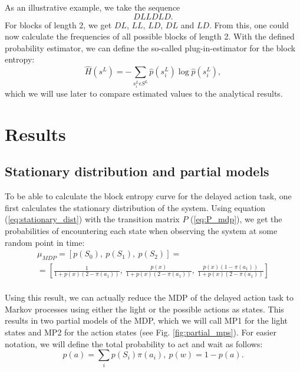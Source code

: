 \documentclass[12pt,a4paper]{article}
\begin{document}
As an illustrative example, we take the sequence
\begin{equation*}
    D L L D L D.
\end{equation*}
For blocks of length 2, we get $DL$, $LL$, $LD$, $DL$ and $LD$.
From this, one could now calculate the frequencies of all possible blocks of length 2.
With the defined probability estimator, we can define the so-called plug-in-estimator for the block entropy:
\begin{equation}
    \label{eq:plug_in_block_ent}
    \hat{H}(s^L) = -\sum_{s_i^L \epsilon S^L} \hat{p}(s_i^L) \log \hat{p}(s_i^L),
\end{equation}
which we will use later to compare estimated values to the analytical results.

\newpage
\section{Results} \label{sec:results}

\subsection{Stationary distribution and partial models} \label{ssec:res_stationary_dist}
To be able to calculate the block entropy curve for the delayed action task, one first calculates the stationary distribution of the system.
Using equation (\ref{eq:stationary_dist}) with the transition matrix $P$ (\ref{eq:P_mdp}), we get the probabilities of encountering each state when observing the system at some random point in time:
\begin{equation}
    \label{eq:result_stationary_dist_mdp}
    \begin{matrix}
        \mu_{MDP} = [p(S_0),\ p(S_1),\ p(S_2)] =       \\
        =[\frac{1}{1 + p(x)(2-\pi(a_1))},\
        \frac{p(x)}{1 + p(x)(2-\pi(a_1))},\
        \frac{p(x)(1-\pi(a_1))}{1 + p(x)(2-\pi(a_1))}] \\
    \end{matrix}
\end{equation}

Using this result, we can actually reduce the MDP of the delayed action task to Markov processes using either the light or the possible actions as states.
This results in two partial models of the MDP, which we will call MP1 for the light states and MP2 for the action states (see Fig. \ref{fig:partial_mps}).
For easier notation, we will define the total probability to act and wait as follows:
\begin{equation}
    \label{eq:result_prob_act_wait}
    p(a) = \sum_i p(S_i)\pi(a_i),\ p(w) = 1 - p(a).
\end{equation}
\end{document}
